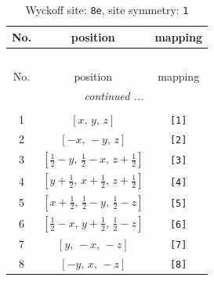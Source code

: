 \documentclass[fleqn,8pt]{jsarticle}
\begin{document}
\renewcommand{\arraystretch}{1.2}
\begin{longtable}{ccc}
\caption{Wyckoff site: {\tt 8e}, site symmetry: {\tt 1}}
 \\
 \hline \hline
No. & position & mapping \\ \hline \endfirsthead

\multicolumn{2}{l}{\tablename\ \thetable{}} \\
 \hline \hline
No. & position & mapping \\ \hline \endhead

 \hline \hline
\multicolumn{2}{r}{\footnotesize\it continued ...} \\ \endfoot

 \hline \hline
\multicolumn{2}{r}{} \\ \endlastfoot

1 & $\left[ x,\, y,\, z \right]$ & {\tt [1]} \\ \hline
2 & $\left[ - x,\, - y,\, z \right]$ & {\tt [2]} \\ \hline
3 & $\left[ \frac{1}{2} - y,\, \frac{1}{2} - x,\, z + \frac{1}{2} \right]$ & {\tt [3]} \\ \hline
4 & $\left[ y + \frac{1}{2},\, x + \frac{1}{2},\, z + \frac{1}{2} \right]$ & {\tt [4]} \\ \hline
5 & $\left[ x + \frac{1}{2},\, \frac{1}{2} - y,\, \frac{1}{2} - z \right]$ & {\tt [5]} \\ \hline
6 & $\left[ \frac{1}{2} - x,\, y + \frac{1}{2},\, \frac{1}{2} - z \right]$ & {\tt [6]} \\ \hline
7 & $\left[ y,\, - x,\, - z \right]$ & {\tt [7]} \\ \hline
8 & $\left[ - y,\, x,\, - z \right]$ & {\tt [8]} \\
\end{longtable}
\end{document}

